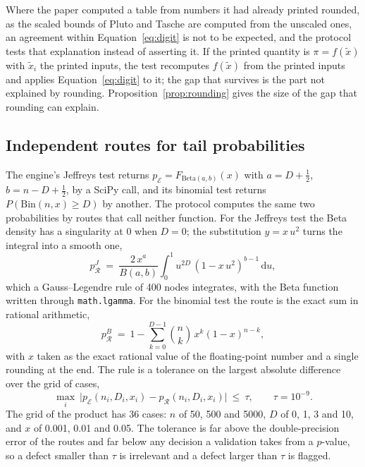 Where the paper computed a table from numbers it had already printed rounded, as the scaled bounds of Pluto and Tasche are computed from the unscaled ones, an agreement within Equation~\eqref{eq:digit} is not to be expected, and the protocol tests that explanation instead of asserting it. If the printed quantity is $\pi=f(\tilde{x})$ with $\tilde{x}_i$ the printed inputs, the test recomputes $f(\tilde{x})$ from the printed inputs and applies Equation~\eqref{eq:digit} to it; the gap that survives is the part not explained by rounding. Proposition~\ref{prop:rounding} gives the size of the gap that rounding can explain.

\subsection{Independent routes for tail probabilities}
\label{sec:proposed-routes}

The engine's Jeffreys test returns $p_{\mathcal{E}}=F_{\mathrm{Beta}(a,b)}(x)$ with $a=D+\tfrac12$, $b=n-D+\tfrac12$, by a SciPy call, and its binomial test returns $P(\mathrm{Bin}(n,x)\ge D)$ by another. The protocol computes the same two probabilities by routes that call neither function. For the Jeffreys test the Beta density has a singularity at $0$ when $D=0$; the substitution $y=x\,u^{2}$ turns the integral into a smooth one,
\begin{equation}
p_{\mathcal{R}}^{J}\ =\ \frac{2\,x^{a}}{B(a,b)}\int_0^1 u^{2D}\,(1-x\,u^{2})^{b-1}\,\mathrm{d}u,
\label{eq:jeffreys-quad}
\end{equation}
which a Gauss--Legendre rule of 400 nodes integrates, with the Beta function written through \texttt{math.lgamma}. For the binomial test the route is the exact sum in rational arithmetic,
\begin{equation}
p_{\mathcal{R}}^{B}\ =\ 1-\sum_{k=0}^{D-1}\binom{n}{k}\,x^{k}(1-x)^{n-k},
\label{eq:binomial-exact}
\end{equation}
with $x$ taken as the exact rational value of the floating-point number and a single rounding at the end. The rule is a tolerance on the largest absolute difference over the grid of cases,
\begin{equation}
\max_{i}\ \bigl\lvert p_{\mathcal{E}}(n_i,D_i,x_i)-p_{\mathcal{R}}(n_i,D_i,x_i)\bigr\rvert\ \le\ \tau,\qquad \tau=10^{-9}.
\label{eq:route-tol}
\end{equation}
The grid of the product has 36 cases: $n$ of 50, 500 and 5000, $D$ of 0, 1, 3 and 10, and $x$ of 0.001, 0.01 and 0.05. The tolerance is far above the double-precision error of the routes and far below any decision a validation takes from a $p$-value, so a defect smaller than $\tau$ is irrelevant and a defect larger than $\tau$ is flagged.

